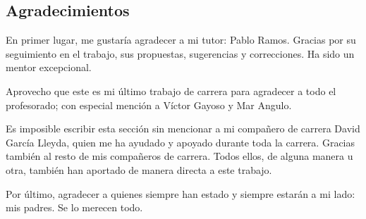 \thispagestyle{empty}

\subsection*{Agradecimientos}

En primer lugar, me gustaría agradecer a mi tutor: Pablo Ramos. Gracias por su seguimiento en el trabajo, sus propuestas, sugerencias y correcciones. Ha sido un mentor excepcional.

Aprovecho que este es mi último trabajo de carrera para agradecer a todo el profesorado; con especial mención a Víctor Gayoso y Mar Angulo. 

Es imposible escribir esta sección sin mencionar a mi compañero de carrera David García Lleyda, quien me ha ayudado y apoyado durante toda la carrera. Gracias también al resto de mis compañeros de carrera. Todos ellos, de alguna manera u otra, también han aportado de manera directa a este trabajo.

Por último, agradecer a quienes siempre han estado y siempre estarán a mi lado: mis padres. Se lo merecen todo.

